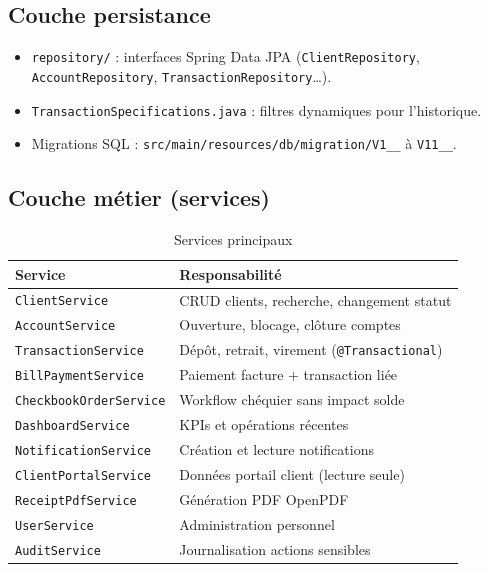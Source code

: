 \subsection{Couche persistance}

\begin{itemize}[leftmargin=*]
    \item \texttt{repository/} : interfaces Spring Data JPA (\texttt{ClientRepository}, \texttt{AccountRepository}, \texttt{TransactionRepository}…).
    \item \texttt{TransactionSpecifications.java} : filtres dynamiques pour l'historique.
    \item Migrations SQL : \texttt{src/main/resources/db/migration/V1\_\_} à \texttt{V11\_\_}.
\end{itemize}

\subsection{Couche métier (services)}

\begin{table}[H]
    \centering
    \caption{Services principaux}
    \label{tab:services}
    \small
    \begin{tabular}{@{}lp{9cm}@{}}
        \toprule
        \textbf{Service} & \textbf{Responsabilité} \\
        \midrule
        \texttt{ClientService} & CRUD clients, recherche, changement statut \\
        \texttt{AccountService} & Ouverture, blocage, clôture comptes \\
        \texttt{TransactionService} & Dépôt, retrait, virement (\texttt{@Transactional}) \\
        \texttt{BillPaymentService} & Paiement facture + transaction liée \\
        \texttt{CheckbookOrderService} & Workflow chéquier sans impact solde \\
        \texttt{DashboardService} & KPIs et opérations récentes \\
        \texttt{NotificationService} & Création et lecture notifications \\
        \texttt{ClientPortalService} & Données portail client (lecture seule) \\
        \texttt{ReceiptPdfService} & Génération PDF OpenPDF \\
        \texttt{UserService} & Administration personnel \\
        \texttt{AuditService} & Journalisation actions sensibles \\
        \bottomrule
    \end{tabular}
\end{table}

